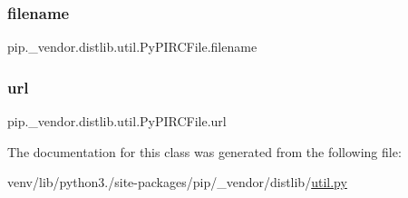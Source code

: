 \subsubsection{\texorpdfstring{filename}{filename}}
{\footnotesize\ttfamily pip.\+\_\+vendor.\+distlib.\+util.\+Py\+P\+I\+R\+C\+File.\+filename}

\mbox{\label{classpip_1_1__vendor_1_1distlib_1_1util_1_1PyPIRCFile_a4e3b6af9bc61da415ac66bf2bfc36a78}} 
\subsubsection{\texorpdfstring{url}{url}}
{\footnotesize\ttfamily pip.\+\_\+vendor.\+distlib.\+util.\+Py\+P\+I\+R\+C\+File.\+url}



The documentation for this class was generated from the following file\+:\begin{DoxyCompactItemize}
\item 
venv/lib/python3./site-\/packages/pip/\+\_\+vendor/distlib/\hyperlink{pip_2__vendor_2distlib_2util_8py}{util.\+py}\end{DoxyCompactItemize}
